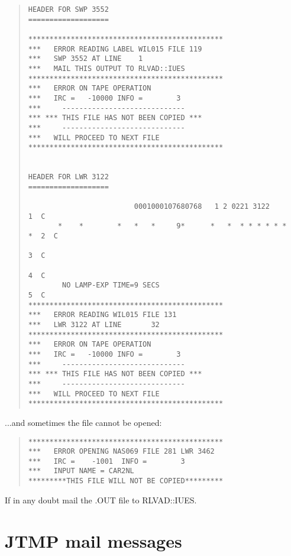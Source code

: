 \begin{quote}
{\small
\begin{verbatim}
HEADER FOR SWP 3552
===================

**********************************************
***   ERROR READING LABEL WIL015 FILE 119
***   SWP 3552 AT LINE    1
***   MAIL THIS OUTPUT TO RLVAD::IUES
**********************************************
***   ERROR ON TAPE OPERATION
***   IRC =   -10000 INFO =        3
***     -----------------------------
*** *** THIS FILE HAS NOT BEEN COPIED ***
***     -----------------------------
***   WILL PROCEED TO NEXT FILE
**********************************************


HEADER FOR LWR 3122
===================

                         0001000107680768   1 2 0221 3122            1  C
       *    *        *   *   *     9*      *   *  * * * * * *     *  2  C
                                                                     3  C
                                                                     4  C
        NO LAMP-EXP TIME=9 SECS                                      5  C
**********************************************
***   ERROR READING WIL015 FILE 131
***   LWR 3122 AT LINE       32
**********************************************
***   ERROR ON TAPE OPERATION
***   IRC =   -10000 INFO =        3
***     -----------------------------
*** *** THIS FILE HAS NOT BEEN COPIED ***
***     -----------------------------
***   WILL PROCEED TO NEXT FILE
**********************************************
\end{verbatim}
}
\end{quote}

...and sometimes the file cannot be opened:

\begin{quote}
{\small
\begin{verbatim}
**********************************************
***   ERROR OPENING NAS069 FILE 281 LWR 3462
***   IRC =    -1001  INFO =        3
***   INPUT NAME = CAR2NL
*********THIS FILE WILL NOT BE COPIED*********
\end{verbatim}
}
\end{quote}

If in any doubt mail the .OUT file to RLVAD::IUES.

\section {JTMP mail messages}
\label{jtmp}

